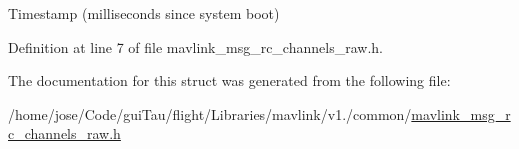 Timestamp (milliseconds since system boot) 



Definition at line 7 of file mavlink\-\_\-msg\-\_\-rc\-\_\-channels\-\_\-raw.\-h.



The documentation for this struct was generated from the following file\-:\begin{DoxyCompactItemize}
\item 
/home/jose/\-Code/gui\-Tau/flight/\-Libraries/mavlink/v1./common/\hyperlink{mavlink__msg__rc__channels__raw_8h}{mavlink\-\_\-msg\-\_\-rc\-\_\-channels\-\_\-raw.\-h}\end{DoxyCompactItemize}
